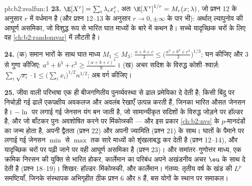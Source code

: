 \begin{solution}{pb:b2:realfun:1}
\textbf{23.} $\E[X^r] = \sum_i\lambda_ix_i^r$, अतः $\E[X^r]^{1/r} = M_r(x; \lambda)$, जो प्रश्न 12 के अनुसार $r$ में वर्धमान है
(और प्रश्न 12--13 के अनुसार $r \to 0, \pm\infty$ के पार भी): अर्थात् ल्यापुनोव की आघूर्ण
असमिका, जो विशुद्ध रूप से भारित घात माध्यों के बारे में कथन है। सच्चे
यादृच्छिक चरों के लिए वह \cref{ch:b2:randomvar} में लौटती है।

\textbf{24.} (क) समान भारों के साथ घात माध्य $M_1 \leq M_3$: $\frac{a+b+c}3 \leq \bigl(\frac{a^3+b^3+c^3}3\bigr)^{1/3}$; घन कीजिए और $3$
से गुणा कीजिए: $a^3 + b^3 + c^3 \geq
\frac{(a+b+c)^3}9$। (ख) अचर सदिश के विरुद्ध कोशी--श्वार्ज़: $\sum_i\sqrt{x_i}\cdot1 \leq
\bigl(\sum_ix_i\bigr)^{1/2}n^{1/2}$; अब वर्ग
कीजिए।

\textbf{25.} जीवा वाली परिभाषा एक ही बीजगणितीय पुनर्व्यवस्था से ढाल
प्रमेयिका दे देती है; किसी बिंदु पर निचोड़ी गई ढालें एकपक्षीय अवकलज और
अवलंब रेखाएँ उत्पन्न करती हैं, जिनका भारित औसत जेनसन है। $-\ln$ पर लगाई गई
जेनसन यंग बन जाती है, जो सामान्यीकृत सदिशों के विरुद्ध जोड़ने पर हॉल्डर
है, और जो बाँटकर पुनः अवशोषित करने पर मिंकोव्स्की --- और इस प्रकार \cref{ch:b2:nvs}
के $p$-मानदंडों का जन्म होता है, अपनी द्वैतता (प्रश्न 22) और अपनी
ज्यामिति (प्रश्न 21) के साथ। घातों के पैमाने पर लगाई गई जेनसन $\min$ से $\max$
तक सारे माध्यों को शृंखलाबद्ध कर देती है (प्रश्न 12--14), और यादृच्छिक
चरों पर पढ़ी जाने पर वही आघूर्ण असमिका है (प्रश्न 23)। और
समांतर--गुणोत्तर माध्य, एक क्रमिक निरसन की युक्ति से भारित होकर,
कार्लेमान का परिबंध अपने अखंडनीय अचर $\eu$ के साथ दे देती है (प्रश्न
18--19)। शिखर: हॉल्डर--मिंकोव्स्की, और कार्लेमान। गंतव्य: तृतीय वर्ष के
खंड की $L^p$ समष्टियाँ, जिनके संस्थापक अभिगृहीत ठीक प्रश्न 6 और 8 हैं, बस
योगों के स्थान पर समाकल।
\end{solution}
